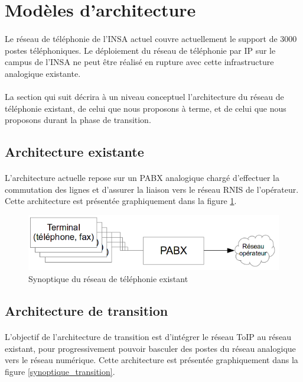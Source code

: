 \section{Modèles d'architecture}

\paragraph{} Le réseau de téléphonie de l'INSA actuel couvre actuellement le
support de 3000 postes téléphoniques. Le déploiement du réseau de téléphonie par
IP sur le campus de l'INSA ne peut être réalisé en rupture avec cette
infrastructure analogique existante.

\paragraph{} La section qui suit décrira à un niveau conceptuel l'architecture
du réseau de téléphonie existant, de celui que nous proposons à terme, et de
celui que nous proposons durant la phase de transition.

\subsection{Architecture existante}
\paragraph{} L'architecture actuelle repose sur un \ac{PABX} analogique chargé
d'effectuer la commutation des lignes et d'assurer la liaison vers le réseau
\ac{RNIS} de l'opérateur. Cette architecture est présentée graphiquement dans la
figure \ref{synoptique_existant}.

\begin{figure}[h]
  \caption{\label{synoptique_existant} Synoptique du réseau de téléphonie
    existant}
  \includegraphics{Existant.png}
\end{figure}

\subsection{Architecture de transition}
\paragraph{} L'objectif de l'architecture de transition est d'intégrer
le réseau ToIP au réseau existant, pour progressivement pouvoir basculer des
postes du réseau analogique vers le réseau numérique. Cette architecture est
présentée graphiquement dans la figure \ref{synoptique_transition}.

